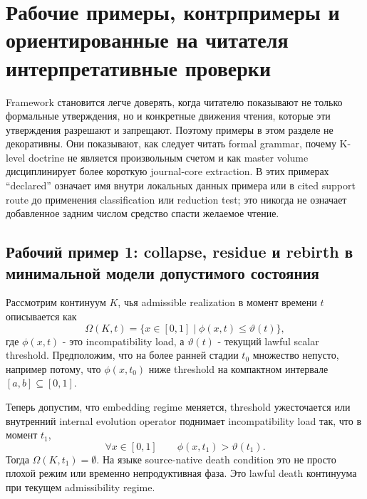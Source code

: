 \section{Рабочие примеры, контрпримеры и ориентированные на читателя интерпретативные проверки}
\label{sec:oc13-worked-examples}

Framework становится легче доверять, когда читателю показывают не только
формальные утверждения, но и конкретные движения чтения, которые эти
утверждения разрешают и запрещают. Поэтому примеры в этом разделе не
декоративны. Они показывают, как следует читать formal grammar, почему
K-level doctrine не является произвольным счетом и как master volume
дисциплинирует более короткую journal-core extraction. В этих примерах
``declared'' означает имя внутри локальных данных примера или в cited support
route до применения classification или reduction test; это никогда не
означает добавленное задним числом средство спасти желаемое чтение.

\subsection{Рабочий пример 1: collapse, residue и rebirth в минимальной модели допустимого состояния}

Рассмотрим континуум \(K\), чья admissible realization в момент времени \(t\)
описывается как
\[
\Omega(K,t) = \{x \in [0,1] \mid \phi(x,t) \le \vartheta(t)\},
\]
где \(\phi(x,t)\) - это incompatibility load, а \(\vartheta(t)\) - текущий
lawful scalar threshold. Предположим, что на более ранней стадии \(t_0\)
множество непусто, например потому, что \(\phi(x,t_0)\) ниже threshold на
компактном интервале \([a,b]\subseteq [0,1]\).

Теперь допустим, что embedding regime меняется, threshold ужесточается или
внутренний internal evolution operator поднимает incompatibility load так,
что в момент \(t_1\),
\[
\forall x \in [0,1] \qquad \phi(x,t_1) > \vartheta(t_1).
\]
Тогда \(\Omega(K,t_1)=\emptyset\). На языке source-native death condition
это не просто плохой режим или временно непродуктивная фаза. Это lawful death
континуума при текущем admissibility regime.

